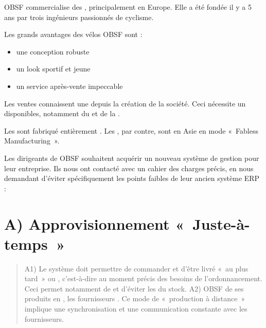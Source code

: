 \documentclass[letterpaper,10pt,french]{sphinxmanual}
\begin{document}
OBSF commercialise des , principalement en Europe. Elle a été fondée il y a 5 ans par trois ingénieurs passionnés de cyclisme.

Les grands avantages des vélos OBSF sont :
\begin{itemize}
\item {} 
une conception robuste

\item {} 
un look sportif et jeune

\item {} 
un service après-vente impeccable

\end{itemize}

Les ventes connaissent une  depuis la création de la société. Ceci nécessite un  disponibles, notamment du  et de la .

Les  sont fabriqué entièrement . Les , par contre, sont  en Asie en mode « Fabless Manufacturing ».

Les dirigeants de OBSF souhaitent acquérir un nouveau système de gestion pour leur entreprise. Ils nous ont contacté avec un cahier des charges précis, en nous demandant d’éviter spécifiquement les points faibles de leur ancien système ERP :


\section{A) Approvisionnement « Juste-à-temps »}
\label{\detokenize{readthedocs/study:a-approvisionnement-juste-a-temps}}\begin{quote}

A1) Le système doit permettre de commander et d’être livré « au plus tard » ou , c’est-à-dire au moment précis des besoins de l’ordonnancement. Ceci permet notamment de  et d’éviter les  du stock.
A2) OBSF  de ses produits en , les fournisseurs . Ce mode de « production à distance » implique une synchronisation et une communication constante avec les fournisseurs.
\end{quote}
\end{document}
